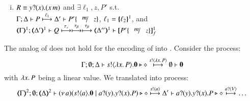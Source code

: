 \begin{proposition}
\begin{enumerate}[1.]
\begin{enumerate}[a)]
\begin{enumerate}[(i)]
						\item	$R \equiv y ? (x) . (x\, {m})$ and 
							$\exists \ell_1, z, P'$ s.t. \\
							$\horel{\Gamma}{\Delta}{P}{\hby{\ell_1}}{\Delta'}{P' \subst{m}{z}}$, 
							$\ell_1 = \{\!\!\{\ell_2\}\!\!\}^{1}$,
							and\\
							$\horel{\tmap{\Gamma}{1}}{\tmap{\Delta'}{1}}{Q}{\hby{\stau} \hby{\btau} \hby{\btau}}{\tmap{\Delta''}{1}}{\pmapp{P'\subst{m}{z}}{1}{f}}$
					\end{enumerate}
			
%
%
		    \end{enumerate}
		    
	\end{enumerate}
\end{proposition}

The analog of  does not hold for the encoding of \HOp into \sessp.
Consider the \HOp process:
\[
	\Gamma; \emptyset; \Delta \vdash s ! \langle \lambda x.\,P \rangle . \mathbf{0} \triangleright \diamond \stackrel{s ! \langle \lambda x.\,P \rangle}{\longmapsto} \emptyset \vdash \mathbf{0}
\]
with $\lambda x.\,P$ being a linear value.
We translated into \sessp process:
\[\tmap{\Gamma}{2}; \es; \tmap{\Delta}{2} \proves \newsp{a}{\bout{s}{a} \inact \Par \binp{a}{y} \binp{y}{x} P} \hastype \Proc
	 \hby{\bactout{s}{a}} \Delta' \proves \binp{a}{y} \binp{y}{x} P \hastype \Proc
\hby{\bactinp{a}{V}} \dots
\]

